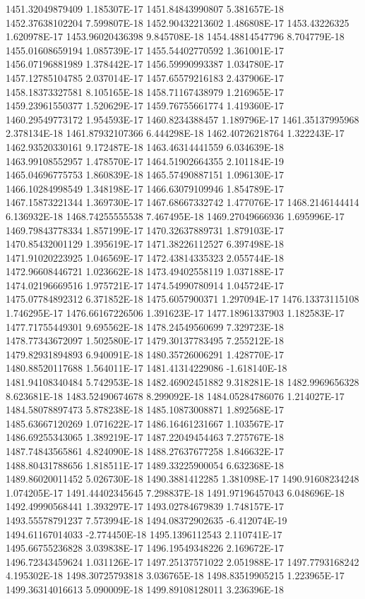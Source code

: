 1451.32049879409  1.185307E-17
1451.84843990807  5.381657E-18
1452.37638102204  7.599807E-18
1452.90432213602  1.486808E-17
1453.43226325  1.620978E-17
1453.96020436398  9.845708E-18
1454.48814547796  8.704779E-18
1455.01608659194  1.085739E-17
1455.54402770592  1.361001E-17
1456.07196881989  1.378442E-17
1456.59990993387  1.034780E-17
1457.12785104785  2.037014E-17
1457.65579216183  2.437906E-17
1458.18373327581  8.105165E-18
1458.71167438979  1.216965E-17
1459.23961550377  1.520629E-17
1459.76755661774  1.419360E-17
1460.29549773172  1.954593E-17
1460.8234388457  1.189796E-17
1461.35137995968  2.378134E-18
1461.87932107366  6.444298E-18
1462.40726218764  1.322243E-17
1462.93520330161  9.172487E-18
1463.46314441559  6.034639E-18
1463.99108552957  1.478570E-17
1464.51902664355  2.101184E-19
1465.04696775753  1.860839E-18
1465.57490887151  1.096130E-17
1466.10284998549  1.348198E-17
1466.63079109946  1.854789E-17
1467.15873221344  1.369730E-17
1467.68667332742  1.477076E-17
1468.2146144414  6.136932E-18
1468.74255555538  7.467495E-18
1469.27049666936  1.695996E-17
1469.79843778334  1.857199E-17
1470.32637889731  1.879103E-17
1470.85432001129  1.395619E-17
1471.38226112527  6.397498E-18
1471.91020223925  1.046569E-17
1472.43814335323  2.055744E-18
1472.96608446721  1.023662E-18
1473.49402558119  1.037188E-17
1474.02196669516  1.975721E-17
1474.54990780914  1.045724E-17
1475.07784892312  6.371852E-18
1475.6057900371  1.297094E-17
1476.13373115108  1.746295E-17
1476.66167226506  1.391623E-17
1477.18961337903  1.182583E-17
1477.71755449301  9.695562E-18
1478.24549560699  7.329723E-18
1478.77343672097  1.502580E-17
1479.30137783495  7.255212E-18
1479.82931894893  6.940091E-18
1480.35726006291  1.428770E-17
1480.88520117688  1.564011E-17
1481.41314229086  -1.618140E-18
1481.94108340484  5.742953E-18
1482.46902451882  9.318281E-18
1482.9969656328  8.623681E-18
1483.52490674678  8.299092E-18
1484.05284786076  1.214027E-17
1484.58078897473  5.878238E-18
1485.10873008871  1.892568E-17
1485.63667120269  1.071622E-17
1486.16461231667  1.103567E-17
1486.69255343065  1.389219E-17
1487.22049454463  7.275767E-18
1487.74843565861  4.824090E-18
1488.27637677258  1.846632E-17
1488.80431788656  1.818511E-17
1489.33225900054  6.632368E-18
1489.86020011452  5.026730E-18
1490.3881412285  1.381098E-17
1490.91608234248  1.074205E-17
1491.44402345645  7.298837E-18
1491.97196457043  6.048696E-18
1492.49990568441  1.393297E-17
1493.02784679839  1.748157E-17
1493.55578791237  7.573994E-18
1494.08372902635  -6.412074E-19
1494.61167014033  -2.774450E-18
1495.1396112543  2.110741E-17
1495.66755236828  3.039838E-17
1496.19549348226  2.169672E-17
1496.72343459624  1.031126E-17
1497.25137571022  2.051988E-17
1497.7793168242  4.195302E-18
1498.30725793818  3.036765E-18
1498.83519905215  1.223965E-17
1499.36314016613  5.090009E-18
1499.89108128011  3.236396E-18
